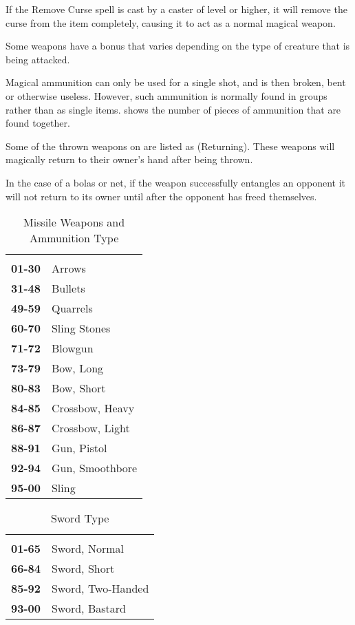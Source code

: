 \begin{multicols*}{2}
If the Remove Curse spell is cast by a caster of  level or higher, it will remove the curse from the item completely, causing it to act as a normal magical weapon.

Some weapons have a bonus that varies depending on the type of creature that is being attacked.

Magical ammunition can only be used for a single shot, and is then broken, bent or otherwise useless. However, such ammunition is normally found in groups rather than as single items.   shows the number of pieces of ammunition that are found together.

Some of the thrown weapons on  are listed as (Returning). These weapons will magically return to their owner’s hand after being thrown.

In the case of a bolas or net, if the weapon successfully entangles an opponent it will not return to its owner until after the opponent has freed themselves.

\begin {table}[H]
  \caption{Missile Weapons and Ammunition Type}\label{tab:Missile Weapons and Ammunition Type}
  \begin{tabularx}{\columnwidth}{>{\bfseries}YY}
	 & \\
	01-30 & Arrows\\
	31-48 & Bullets\\
	49-59 & Quarrels\\
	60-70 & Sling Stones\\
	71-72 & Blowgun\\
	73-79 & Bow, Long\\
	80-83 & Bow, Short\\
	84-85 & Crossbow, Heavy\\
	86-87 & Crossbow, Light\\
	88-91 & Gun, Pistol\\
	92-94 & Gun, Smoothbore\\
	95-00 & Sling
  \end {tabularx}
\end {table}

\begin {table}[H]
  \caption{Sword Type}
  \begin{tabularx}{\columnwidth}{>{\bfseries}YY}
		 & \\
	01-65 & Sword, Normal\\
	66-84 & Sword, Short\\
	85-92 & Sword, Two-Handed\\
	93-00 & Sword, Bastard
  \end {tabularx}
\end {table}


\end{multicols*}
